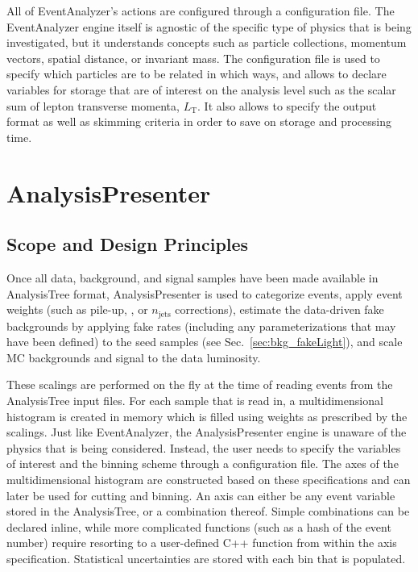 All of EventAnalyzer's actions are configured through a configuration file. The EventAnalyzer engine itself is agnostic of the specific type of physics that is being investigated, but it understands concepts such as particle collections, momentum vectors, spatial distance, or invariant mass. The configuration file is used to specify which particles are to be related in which ways, and allows to declare variables for storage that are of interest on the analysis level such as the scalar sum of lepton transverse momenta, $L_\textrm{T}$. It also allows to specify the output format as well as skimming criteria in order to save on storage and processing time.

\section{AnalysisPresenter}
\label{app:Software/AnalysisPresenter}

\subsection{Scope and Design Principles}
Once all data, background, and signal samples have been made available in AnalysisTree format, AnalysisPresenter is used to categorize events, apply event weights (such as pile-up, \pt, or $n_\textrm{jets}$ corrections), estimate the data-driven fake backgrounds by applying fake rates (including any parameterizations that may have been defined) to the seed samples (see Sec.~\ref{sec:bkg_fakeLight}), and scale MC backgrounds and signal to the data luminosity.

These scalings are performed on the fly at the time of reading events from the AnalysisTree input files. For each sample that is read in, a multidimensional histogram is created in memory which is filled using weights as prescribed by the scalings. Just like EventAnalyzer, the AnalysisPresenter engine is unaware of the physics that is being considered. Instead, the user needs to specify the variables of interest and the binning scheme through a configuration file. The axes of the multidimensional histogram are constructed based on these specifications and can later be used for cutting and binning. An axis can either be any event variable stored in the AnalysisTree, or a combination thereof. Simple combinations can be declared inline, while more complicated functions (such as a hash of the event number) require resorting to a user-defined C++ function from within the axis specification. Statistical uncertainties are stored with each bin that is populated.


